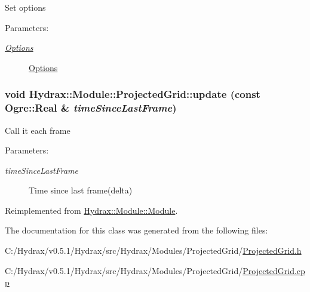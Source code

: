 Set options \begin{Desc}
\item[Parameters:]
\begin{description}
\item[{\em \hyperlink{struct_hydrax_1_1_module_1_1_projected_grid_1_1_options}{Options}}]\hyperlink{struct_hydrax_1_1_module_1_1_projected_grid_1_1_options}{Options} \end{description}
\end{Desc}
\hypertarget{class_hydrax_1_1_module_1_1_projected_grid_8d7a8efcd6b7fd0e4313c9114bd2c061}{
\subsubsection[{update}]{\setlength{\rightskip}{0pt plus 5cm}void Hydrax::Module::ProjectedGrid::update (const Ogre::Real \& {\em timeSinceLastFrame})}}
\label{class_hydrax_1_1_module_1_1_projected_grid_8d7a8efcd6b7fd0e4313c9114bd2c061}


Call it each frame \begin{Desc}
\item[Parameters:]
\begin{description}
\item[{\em timeSinceLastFrame}]Time since last frame(delta) \end{description}
\end{Desc}


Reimplemented from \hyperlink{class_hydrax_1_1_module_1_1_module_2042d450f99d9348fa4b7bd29ba89df3}{Hydrax::Module::Module}.

The documentation for this class was generated from the following files:\begin{CompactItemize}
\item 
C:/Hydrax/v0.5.1/Hydrax/src/Hydrax/Modules/ProjectedGrid/\hyperlink{_projected_grid_8h}{ProjectedGrid.h}\item 
C:/Hydrax/v0.5.1/Hydrax/src/Hydrax/Modules/ProjectedGrid/\hyperlink{_projected_grid_8cpp}{ProjectedGrid.cpp}\end{CompactItemize}
